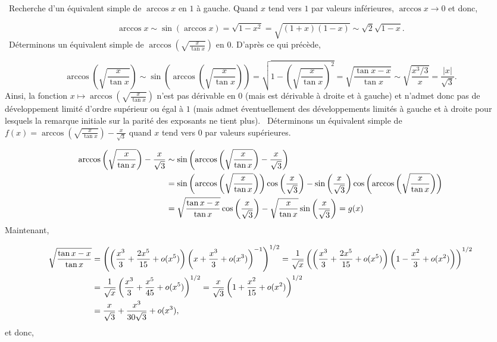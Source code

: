 \documentclass[11pt,a4paper]{article}
\newcommand{\Arccos}{\mathop{\mathrm{arccos}}\nolimits}
\begin{document}
\begin{enumerate}
\begin{enumerate}
  \end{enumerate}

\textbullet~Recherche d'un équivalent simple de $\Arccos x$ en $1$ à gauche.
Quand $x$ tend vers $1$ par valeurs inférieures, $\Arccos x\rightarrow 0$ et donc,

$$\Arccos x\sim\sin(\Arccos x)=\sqrt{1-x^2}=\sqrt{(1+x)(1-x)}\sim\sqrt{2}\sqrt{1-x}.$$ 
\textbullet~Déterminons un équivalent simple de $\Arccos\left(\sqrt{\frac{x}{\tan x}}\right)$ en $0$. D'après ce qui précède,

$$\Arccos\left(\sqrt{\frac{x}{\tan x}}\right)\sim\sin\left(\Arccos\left(\sqrt{\frac{x}{\tan x}}\right)\right)=\sqrt{1-\left(\sqrt{\frac{x}{\tan x}}\right)^2}=\sqrt{\frac{\tan x-x}{\tan x}}\sim\sqrt{\frac{x^3/3}{x}}=\frac{|x|}{\sqrt{3}}.$$
Ainsi, la fonction $x\mapsto\Arccos\left(\sqrt{\frac{x}{\tan x}}\right)$ n'est pas dérivable en $0$ (mais est dérivable à droite et à gauche) et n'admet donc pas de développement limité d'ordre supérieur ou égal à $1$ (mais admet éventuellement des développements limités à gauche et à droite pour lesquels la remarque initiale sur la parité des exposants ne tient plus).
\textbullet~Déterminons un équivalent simple de $f(x)=\Arccos\left(\sqrt{\frac{x}{\tan x}}\right)-\frac{x}{\sqrt{3}}$ quand $x$ tend vers $0$ par valeurs supérieures.

\begin{align*}\ensuremath
\Arccos\left(\sqrt{\frac{x}{\tan x}}\right)-\frac{x}{\sqrt{3}}&\sim\sin\left(\Arccos\left(\sqrt{\frac{x}{\tan x}}\right)-\frac{x}{\sqrt{3}}\right)\\
 &=\sin\left(\Arccos\left(\sqrt{\frac{x}{\tan x}}\right)\right)\cos\left(\frac{x}{\sqrt{3}}\right)-\sin\left(\frac{x}{\sqrt{3}}\right)\cos\left(\Arccos\left(\sqrt{\frac{x}{\tan x}}\right)\right)\\
 &=\sqrt{\frac{\tan x-x}{\tan x}}\cos\left(\frac{x}{\sqrt{3}}\right)-\sqrt{\frac{x}{\tan x}}\sin\left(\frac{x}{\sqrt{3}}\right)=g(x)
\end{align*}
Maintenant,

\begin{align*}\ensuremath
\sqrt{\frac{\tan x-x}{\tan x}}&=\left(\left(\frac{x^3}{3}+\frac{2x^5}{15}+o(x^5)\right)\left(x+\frac{x^3}{3}+o(x^3)\right)^{-1}\right)^{1/2}=
\frac{1}{\sqrt{x}}\left(\left(\frac{x^3}{3}+\frac{2x^5}{15}+o(x^5)\right)\left(1-\frac{x^2}{3}+o(x^2)\right)\right)^{1/2}\\
 &=\frac{1}{\sqrt{x}}\left(\frac{x^3}{3}+\frac{x^5}{45}+o(x^5)\right)^{1/2}=\frac{x}{\sqrt{3}}\left(1+\frac{x^2}{15}+o(x^2)\right)^{1/2}\\
 &=\frac{x}{\sqrt{3}}+\frac{x^3}{30\sqrt{3}}+o(x^3),
\end{align*}
et donc,


\end{enumerate}
\end{document}
